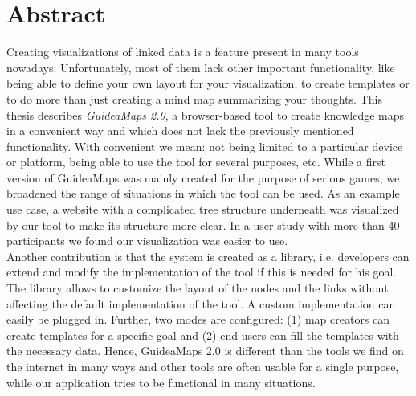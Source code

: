 \section*{Abstract}%

\color{blue}

Creating visualizations of linked data is a feature present in many tools nowadays. Unfortunately, most of them lack other important functionality, like being able to define your own layout for your visualization, to create templates or to do more than just creating a mind map summarizing your thoughts. This thesis describes \textit{GuideaMaps 2.0}, a browser-based tool to create knowledge maps in a convenient way and which does not lack the previously mentioned functionality. With convenient we mean: not being limited to a particular device or platform, being able to use the tool for several purposes, etc. While a first version of GuideaMaps was mainly created for the purpose of serious games, we broadened the range of situations in which the tool can be used. As an example use case, a website with a complicated tree structure underneath was visualized by our tool to make its structure more clear. In a user study with more than 40 participants we found our visualization was easier to use.\\

Another contribution is that the system is created as a library, i.e. developers can extend and modify the implementation of the tool if this is needed for his goal. The library allows to customize the layout of the nodes and the links without affecting the default implementation of the tool. A custom implementation can easily be plugged in. Further, two modes are configured: (1) map creators can create templates for a specific goal and (2) end-users can fill the templates with the necessary data. Hence, GuideaMaps 2.0 is different than the tools we find on the internet in many ways and other tools are often usable for a single purpose, while our application tries to be functional in many situations.

\color{black}